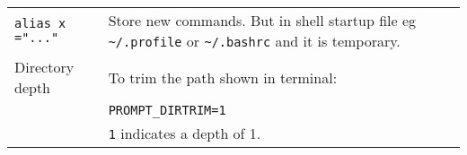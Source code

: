 \begin{tabularx}{\linewidth}{lX}
    \texttt{alias x ="..."}             & Store new commands. But in shell startup file eg \texttt{\~{}/.profile} or \texttt{\~{}/.bashrc} and it is temporary.\\
    Directory depth                     & To trim the path shown in terminal:\\
                                        & \texttt{PROMPT\_DIRTRIM=1}\\
                                        & \texttt{1} indicates a depth of 1.\\
\end{tabularx}